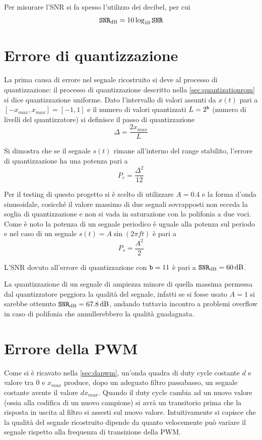 Per misurare l'SNR si fa spesso l'utilizzo dei decibel, per cui
\begin{equation}
\code{SNR}_{\SI{}{\decibel}} = 10 \log_{10}{\code{SNR}}
\end{equation}

\section{Errore di quantizzazione}
La prima causa di errore nel segnale ricostruito si deve al processo di quantizzazione:
il processo di quantizzazione descritto nella \cref{sec:quantizationrom} si dice
quantizzazione uniforme.
Dato l'intervallo di valori assunti da $x(t)$ pari a $[-x_{max},x_{max}]=[-1,1]$ e il numero di valori
quantizzati $L=2^{\texttt{b}}$ (numero di livelli del quantizzatore) si definisce il passo di quantizzazione
\[
\Delta = \frac{2 x_{max}}{L}
\]

Si dimostra che se il segnale $s(t)$ rimane all'interno del range stabilito,
l'errore di quantizzazione ha una potenza pari a\cite{tlc}
\[
P_e = \frac{\Delta^2}{12}
\]

Per il testing di questo progetto si è scelto di utilizzare $A=0.4$ e la forma
d'onda sinusoidale, cosicché
il valore massimo di due segnali sovrapposti non ecceda la soglia di quantizzazione
e non si vada in saturazione con la polifonia a due voci.
Come è noto la potenza di un segnale periodico è uguale alla potenza sul periodo
e nel caso di un segnale $s(t)=A\sin(2\pi ft)$ è pari a
\[
P_s = \frac{A^2}{2}
\]

L'SNR dovuto all'errore di quantizzazione con $\texttt{b}=11$ è pari a
$\code{SNR}_{\SI{}{\decibel}} = \SI{60}{\decibel}$.

La quantizzazione di un segnale di ampiezza minore di quella massima permessa
dal quantizzatore peggiora la qualità del segnale, infatti se si fosse usato
$A=1$ si sarebbe ottenuto 
$\code{SNR}_{\SI{}{\decibel}} = \SI{67.8}{\decibel}$, andando tuttavia incontro
a problemi overflow in caso di polifonia che annullerebbero la qualità guadagnata.

\section{Errore della PWM}
Come si è ricavato nella \cref{sec:dapwm}, un'onda quadra di duty cycle costante
$d$ e valore tra $0$ e $x_{max}$ produce, dopo un adeguato filtro passabasso,
un segnale costante avente il valore $d x_{max}$.
Quando il duty cycle cambia ad un nuovo valore (ossia alla codifica di un nuovo
campione) si avrà un transitorio prima che la risposta in uscita al filtro
si assesti sul nuovo valore.
Intuitivamente si capisce che la qualità del segnale ricostruito dipende
da quanto velocemente può variare il segnale rispetto alla frequenza
di transizione della PWM.

